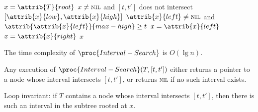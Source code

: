 \begin{codebox}
    \li $x = \attrib{T}{root}$
    \li \While $x \neq \textsc{nil}$ and $[t,t']$ does not intersect $[\attrib{x}{low},\attrib{x}{high}]$ \Do
        \li \If $\attrib{x}{left} \neq \textsc{nil}$ and $\attrib{\attrib{x}{left}}{max-high} \geq t$ \Then
            \li $x = \attrib{x}{left}$
        \li \Else
            \li $x = \attrib{x}{right}$
        \End
    \End
    \li \Return $x$
\end{codebox}

The time complexity of $\proc{Interval-Search}$ is $O(\lg n)$.

\begin{theorem}
    Any execution of $\proc{Interval-Search}(T,[t,t'])$ either returns a pointer to a node whose interval intersects $[t,t']$, or returns \textsc{nil} if no such interval exists.
\end{theorem}

\begin{lemma}
    Loop invariant: if $T$ contains a node whose interval intersects $[t,t']$, then there is such an interval in the subtree rooted at $x$.
\end{lemma}

